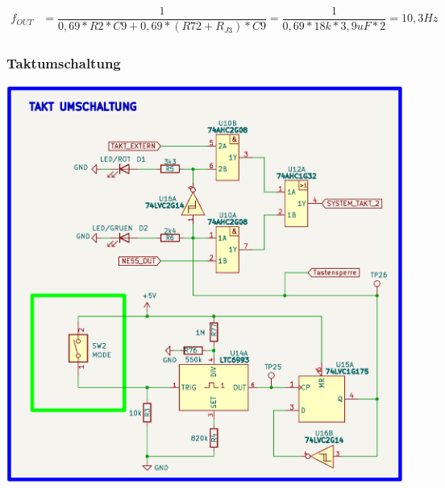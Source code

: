 \begin{center}
\begin{align*}
	f_{OUT} &= \dfrac{1}{0,69*R2*C9 + 0,69*(R72+R_{J3})* C9} = \dfrac{1}{0,69*18k*3,9uF*2} = 10,3Hz
\end{align*} 
\end{center}

\newpage
\subsubsection{Taktumschaltung}

\begin{center}
\includegraphics[width=13cm]{Bilder/Taktumschaltung.png}
\end{center}


